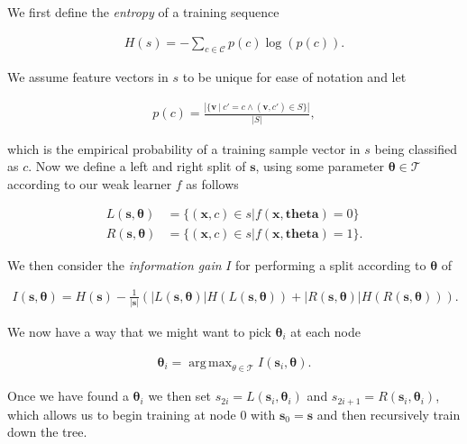 \documentclass[12pt,twoside,notitlepage]{report}
\newcommand{\vc}[1]{\mathbf{#1}}
\newcommand{\cl}[1]{\mathcal{#1}}
\DeclareMathOperator*{\argmax}{arg\,max}
\begin{document}
            We first define the \textit{entropy} of a training sequence

            \begin{align}
                H(s) = - \sum_{c\in\cl{C}} p(c) \log (p(c)).
            \end{align}

            We assume feature vectors in $s$ to be unique for ease of notation and let

            \begin{align}
                p(c) = \frac{\left| \{\vc{v}\ |\ c' = c \land (\vc{v},c') \in S \} \right|}{\left| S \right|},
            \end{align}
            
            which is the empirical probability of a training sample vector in $s$ being classified as $c$. Now we define 
            a left and right split of $\vc{s}$, using some parameter $\vc{\theta} \in \cl{T}$ according to our weak 
            learner $f$ as follows

            \begin{align}
                L(\vc{s},\vc{\theta}) & = \{ (\vc{x}, c) \in s | f(\vc{x}, \vc{theta}) = 0 \} \\
                R(\vc{s},\vc{\theta}) & = \{ (\vc{x}, c) \in s | f(\vc{x}, \vc{theta}) = 1 \}.
            \end{align}

            We then consider the \textit{information gain} $I$ for performing a split according to $\vc{\theta}$ of 

            \begin{align}
                I(\vc{s}, \vc{\theta}) = H(\vc{s}) - \frac{1}{|\vc{s}|} \left( |L(\vc{s}, \vc{\theta})| H(L(\vc{s}, \vc{\theta})) 
                                                                          + |R(\vc{s}, \vc{\theta})| H(R(\vc{s}, \vc{\theta})) \right).
            \end{align} 

            We now have a way that we might want to pick $\vc{\theta}_i$ at each node

            \begin{align} 
                \vc{\theta}_i = \argmax_{\theta\in\cl{T}} I(\vc{s}_i, \vc{\theta}).
            \end{align} 

            Once we have found a $\vc{\theta}_i$ we then set $s_{2i} = L(\vc{s}_i, \vc{\theta}_i)$ and 
            $s_{2i+1} = R(\vc{s}_i, \vc{\theta}_i)$, which allows us to begin training at node $0$ with $\vc{s}_0 = \vc{s}$ 
            and then recursively train down the tree. \cite{criminisi2013decision}
\end{document}
